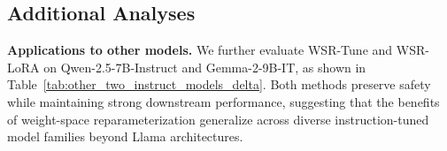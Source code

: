 \documentclass{article}
\newcommand{\djh}[1]{{\leavevmode\color{magenta}[DJ: #1]}}
\begin{document}
\begin{table}[t]
\centering
\small
\caption{Ablation study on Llama-2-7B-Chat. Lower JB AVG indicates stronger safety, and higher Accuracy indicates better downstream performance.}
\label{tab:ablation_llama2_7b_chat}
\vspace{-4mm}
\end{table}



\subsection{Additional Analyses}
\vspace{-1mm}


\textbf{Applications to other models.}  %
We further evaluate WSR-Tune and WSR-LoRA on Qwen-2.5-7B-Instruct and Gemma-2-9B-IT, as shown in Table~\ref{tab:other_two_instruct_models_delta}. Both methods preserve safety while maintaining strong downstream performance, suggesting that the benefits of weight-space reparameterization generalize across diverse instruction-tuned model families beyond Llama architectures.
\end{document}
